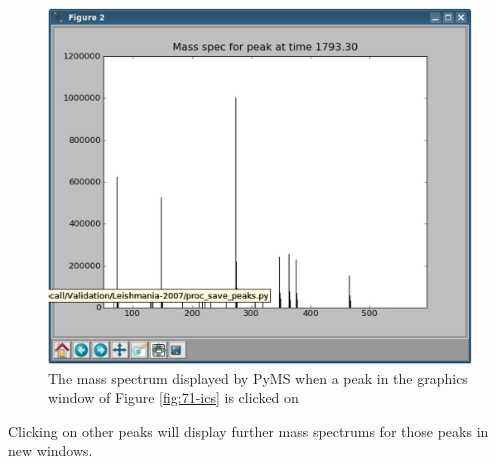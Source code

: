 \begin{figure}
  \begin{center}
    \includegraphics[scale=0.33]{graphics/chapter07/test-71-spec.eps}
  \end{center}
  \caption{The mass spectrum displayed by PyMS when a peak in the
  graphics window of Figure \ref{fig:71-ics} is clicked on}
  \label{fig:71-spec}
\end{figure}

Clicking on other peaks will display further mass spectrums for those peaks
in new windows.

